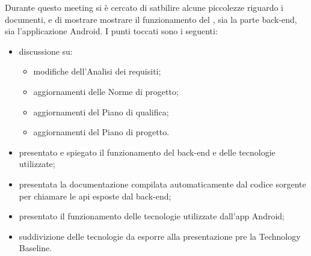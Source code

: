 Durante questo meeting si è cercato di satbilire alcune piccolezze riguardo i documenti, e di mostrare mostrare il funzionamento del , sia la parte back-end, sia l'applicazione Android.
I punti toccati sono i seguenti:
\begin{itemize}
   \item discussione su:
   \begin{itemize}
      \item modifiche dell'Analisi dei requisiti;
      \item aggiornamenti delle Norme di progetto;
      \item aggiornamenti del Piano di qualifica;
      \item aggiornamenti del Piano di progetto.
   \end{itemize}
\item presentato e spiegato il funzionamento del back-end e delle tecnologie utilizzate;
\item presentata la documentazione compilata automaticamente dal codice sorgente per chiamare le api  esposte dal back-end;
\item presentato il funzionamento delle tecnologie utilizzate dall'app Android;
\item suddivizione delle tecnologie da esporre alla presentazione pre la Technology Baseline.
\end{itemize}

